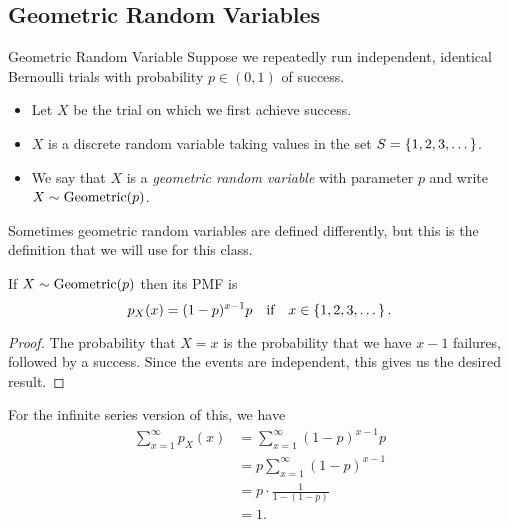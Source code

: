 \documentclass[class=article, crop=false]{standalone}
\begin{document}
  \subsection{Geometric Random Variables}
  \begin{definition}{Geometric Random Variable}
    Suppose we repeatedly run independent, identical Bernoulli trials with probability $p\in (0, 1)$ of success.
    \begin{itemize}
      \item Let $X$ be the trial on which we first achieve success.
      \item $X$ is a discrete random variable taking values in the set $S = \left\{1,2,3,\dotsc\right\}$.
      \item We say that $X$ is a \emph{geometric random variable} with parameter $p$ and write $X\sim \operatorname{Geometric}(p)$.
    \end{itemize}
  \end{definition}
  \begin{note}{}
    Sometimes geometric random variables are defined differently, but this is the definition that we will use for this class.
  \end{note}
  \begin{theorem}{}
    If $X\sim \operatorname{Geometric}(p)$ then its PMF is
    \[
      p_X(x) = (1 - p)^{x - 1}p\quad\text{if}\quad x\in \left\{1,2,3,\dotsc\right\}.
    \]
    \begin{proof}
      The probability that $X = x$ is the probability that we have $x - 1$ failures, followed by a success. Since the events are independent, this gives us the desired result.
    \end{proof}
  \end{theorem}
  \begin{note}{}
    For the infinite series version of this, we have
    \begin{align*}
      \sum_{x=1}^{\infty} p_X(x) &= \sum_{x=1}^{\infty} (1 - p)^{x - 1}p \\
                                 &= p \sum_{x=1}^{\infty}(1 - p)^{x - 1} \\
                                 &= p\cdot \frac{1}{1 - (1 - p)} \\
                                 &= 1.
    \end{align*}
  \end{note}
\end{document}

